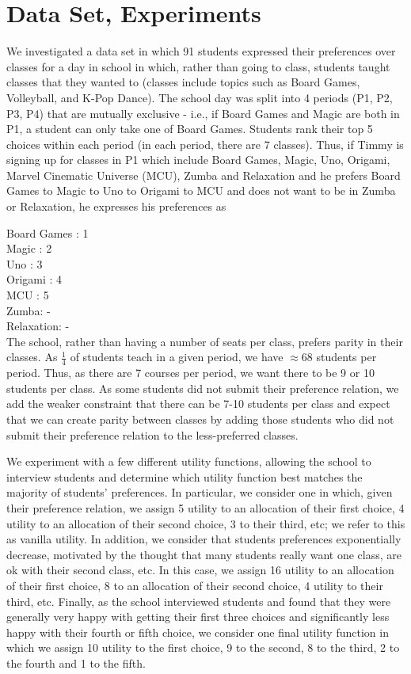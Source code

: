 \section{Data Set, Experiments}
\label{sec:ds}
We investigated a data set in which 91 students expressed their preferences over classes for a day in school in which, rather than going to class, students taught classes that they wanted to (classes include topics such as Board Games, Volleyball, and K-Pop Dance).  The school day was split into 4 periods (P1, P2, P3, P4) that are mutually exclusive - i.e., if Board Games and Magic are both in P1, a student can only take one of Board Games.  Students rank their top 5 choices within each period (in each period, there are 7 classes).  Thus, if Timmy is signing up for classes in P1 which include Board Games, Magic, Uno, Origami, Marvel Cinematic Universe (MCU), Zumba and Relaxation and he prefers Board Games to Magic to Uno to Origami to MCU and does not want to be in Zumba or Relaxation, he expresses his preferences as 

Board Games : 1\\
Magic : 2\\
Uno : 3\\
Origami : 4\\
MCU : 5\\
Zumba: -\\
Relaxation: -\\

The school, rather than having a number of seats per class, prefers parity in their classes.  As $\frac{1}{4}$ of students teach in a given period, we have $\approx 68 $ students per period.  Thus, as there are 7 courses per period, we want there to be 9 or 10 students per class.  As some students did not submit their preference relation, we add the weaker constraint that there can be 7-10 students per class and expect that we can create parity between classes by adding those students who did not submit their preference relation to the less-preferred classes.  

We experiment with a few different utility functions, allowing the school to interview students and determine which utility function best matches the majority of students' preferences.  In particular, we consider one in which, given their preference relation, we assign 5 utility to an allocation of their first choice, 4 utility to an allocation of their second choice, 3 to their third, etc; we refer to this as vanilla utility. In addition, we consider that students preferences exponentially decrease, motivated by the thought that many students really want one class, are ok with their second class, etc.  In this case, we assign 16 utility to an allocation of their first choice, 8 to an allocation of their second choice, 4 utility to their third, etc.  Finally, as the school interviewed students and found that they were generally very happy with getting their first three choices and significantly less happy with their fourth or fifth choice, we consider one final utility function in which we assign 10 utility to the first choice, 9 to the second, 8 to the third, 2 to the fourth and 1 to the fifth.  

